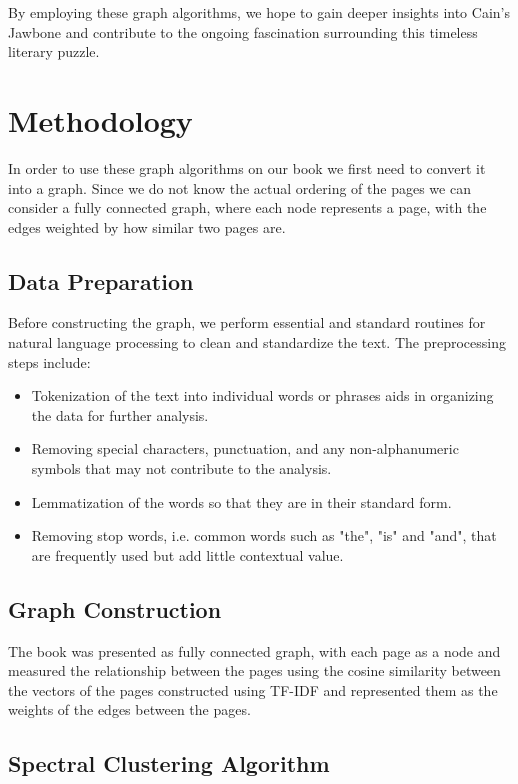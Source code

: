 \documentclass[a4paper]{article}
\begin{document}
By employing these graph algorithms, we hope to gain deeper insights into Cain's Jawbone and contribute to the ongoing fascination surrounding this timeless literary puzzle.


\section{Methodology}

In order to use these graph algorithms on our book we first need to convert it into a graph. Since we do not know the actual ordering of the pages we can consider a fully connected graph, where each node represents a page, with the edges weighted by how similar two pages are.

\subsection{Data Preparation}

Before constructing the graph, we perform essential and standard routines for natural language processing to clean and standardize the text. The preprocessing steps include:

\begin{itemize}
    \item Tokenization of the text into individual words or phrases aids in organizing the data for further analysis.
    \item Removing special characters, punctuation, and any non-alphanumeric symbols that may not contribute to the analysis.
    \item Lemmatization of the words so that they are in their standard form.
    \item Removing stop words, i.e. common words such as "the", "is" and "and", that are frequently used but add little contextual value.
\end{itemize}

\subsection{Graph Construction}

The book was presented as fully connected graph, with each page as a node and measured the relationship between the pages using the cosine similarity between the vectors of the pages constructed using TF-IDF and represented them as the weights of the edges between the pages.

\subsection{Spectral Clustering Algorithm}
\end{document}
